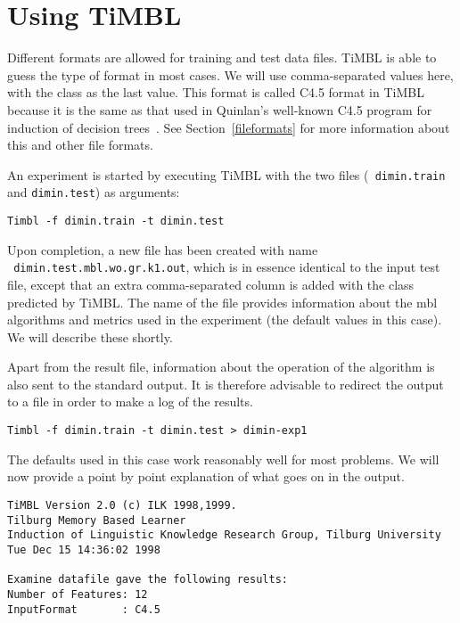 \documentclass{report}
\begin{document}
\section{Using TiMBL}

Different formats are allowed for training and test data files. TiMBL
is able to guess the type of format in most cases. We will use
comma-separated values here, with the class as the last value. This
format is called C4.5 format in TiMBL because it is the same as that
used in Quinlan's well-known C4.5 program for induction of decision
trees~\cite{Quinlan93}. See Section~\ref{fileformats} for more
information about this and other file formats.

An experiment is started by executing TiMBL with the two files ({\tt
dimin.train} and {\tt dimin.test}) as arguments:

{\small
\begin{verbatim}
Timbl -f dimin.train -t dimin.test
\end{verbatim}
}

Upon completion, a new file has been created with name\\ {\tt
dimin.test.mbl.wo.gr.k1.out}, which is in essence identical to the
input test file, except that an extra comma-separated column is added
with the class predicted by TiMBL. The name of the file provides
information about the {\sc mbl} algorithms and metrics used in the
experiment (the default values in this case). We will describe these
shortly.

Apart from the result file, information about the operation of the
algorithm is also sent to the standard output. It is therefore 
advisable to redirect the output to a file in order to make a log of
the results.

{\small
\begin{verbatim}
Timbl -f dimin.train -t dimin.test > dimin-exp1
\end{verbatim}
}

The defaults used in this case work reasonably well for most problems.  We
will now provide a point by point explanation of what goes on in the
output.\\

\vspace{1cm}

\hline

{\small
\begin{verbatim}
TiMBL Version 2.0 (c) ILK 1998,1999.
Tilburg Memory Based Learner
Induction of Linguistic Knowledge Research Group, Tilburg University 
Tue Dec 15 14:36:02 1998

Examine datafile gave the following results:
Number of Features: 12
InputFormat       : C4.5
\end{verbatim}
}
\end{document}
